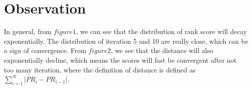 \documentclass[12pt,a4paper]{article}
\begin{document}
\section{Observation}

In general, from $figure 1$, we can see that the distribution of rank score will decay exponentially. The distribution of iteration 5 and 10 are really close, which can be a sign of convergence. 
From $figure 2$, we see that the distance will also exponentially decline, which means the scores will fast be convergent after not too many iteration, where the definition of distance is defined as $\sum\limits_{i=1}^N |PR_i - PR_{i-1}| $.

 
\end{document}
